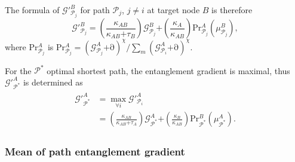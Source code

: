 \documentclass[11pt]{article}%
\begin{document}
 The formula of ${\mathcal{G}}'^B_{{\mathcal{P}}_j}$ for path ${\mathcal{P}}_j$, $j\mathrm{\ne }i$ at target node $B$ is therefore
\begin{equation} \label{22)} 
{\mathcal{G}}'^B_{{\mathcal{P}}_j}\mathrm{=}\left(\frac{{\kappa }_{AB}}{{\kappa }_{AB}\mathrm{+}{\tau }_B}\right){\mathcal{G}}^B_{{\mathcal{P}}_j}\mathrm{+}\left(\frac{{\kappa }_A}{{\kappa }_{AB}}\right)\mathrm{P}{\mathrm{r}}^A_{{\mathcal{P}}_j}\left({\mu }^B_{{\mathcal{P}}_j}\right), 
\end{equation} 
where $\mathrm{P}{\mathrm{r}}^A_{{\mathcal{P}}_j}$ is $\mathrm{P}{\mathrm{r}}^A_{{\mathcal{P}}_j}\mathrm{=}{{\left({\mathcal{G}}^A_{{\mathcal{P}}_j}\mathrm{+}\mathrm{\partial }\right)}^{\chi }}/{{\sum_m{\left({\mathcal{G}}^A_{{\mathcal{P}}_i}\mathrm{+}\mathrm{\partial }\right)}}^{\chi }}$.

 For the ${\mathcal{P}}^{\mathrm{*}}$ optimal shortest path, the entanglement gradient is maximal, thus ${\mathcal{G}}'^A_{{\mathcal{P}}^{\mathrm{*}}}$ is determined as
\begin{equation} \label{ZEqnNum282699} 
 \begin{array}{l}
\begin{split}
{\mathcal{G}}'^A_{{\mathcal{P}}^{\mathrm{*}}}&\mathrm{=}\mathop{\mathrm{max}}_{\mathrm{\forall }i}{\mathcal{G}}'^A_{{\mathcal{P}}_i} \\ 
&\mathrm{=}\left(\frac{{\kappa }_{AB}}{{\kappa }_{AB}\mathrm{+}{\tau }_A}\right){\mathcal{G}}^A_{{\mathcal{P}}^{\mathrm{*}}}\mathrm{+}\left(\frac{{\kappa }_B}{{\kappa }_{AB}}\right)\mathrm{P}{\mathrm{r}}^B_{{\mathcal{P}}^{\mathrm{*}}}\left({\mu }^A_{{\mathcal{P}}^{\mathrm{*}}}\right). 
\end{split}
\end{array}
\end{equation} 
 
\subsubsection{Mean of path entanglement gradient}
\end{document}
